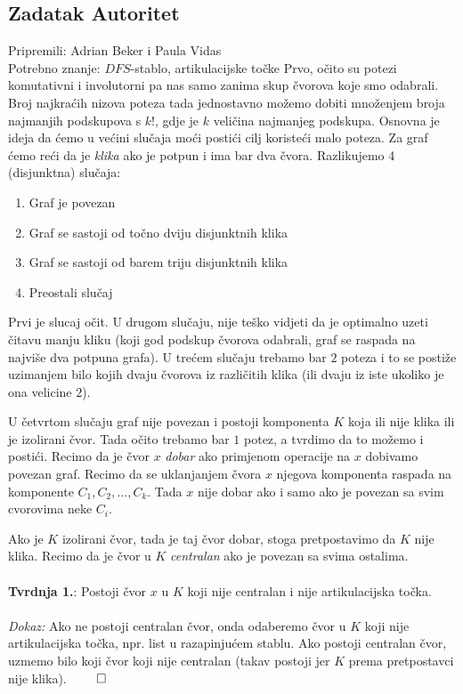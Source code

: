 \subsection*{Zadatak Autoritet}
\textsf{Pripremili: Adrian Beker i Paula Vidas}\\
\textsf{Potrebno znanje: $DFS$-stablo, artikulacijske točke}
Prvo, očito su potezi komutativni i involutorni pa nas samo zanima skup čvorova
koje smo odabrali. Broj najkraćih nizova poteza tada jednostavno možemo dobiti
množenjem broja najmanjih podskupova s $k!$, gdje je $k$ veličina najmanjeg
podskupa. Osnovna je ideja da ćemo u većini slučaja moći postići cilj koristeći
malo poteza. Za graf ćemo reći da je \textit{klika} ako je potpun i ima bar dva čvora. Razlikujemo 4 (disjunktna) slučaja:

\begin{enumerate}
    \item Graf je povezan
    \item Graf se sastoji od točno dviju disjunktnih klika
    \item Graf se sastoji od barem triju disjunktnih klika
    \item Preostali slučaj
\end{enumerate}
Prvi je slucaj očit. U drugom slučaju, nije teško vidjeti da je optimalno uzeti čitavu manju kliku (koji god podskup čvorova odabrali, graf se raspada na najviše dva potpuna grafa).
U trećem slučaju trebamo bar $2$ poteza i to se postiže uzimanjem bilo kojih dvaju čvorova iz različitih klika (ili dvaju iz iste ukoliko je ona velicine $2$).

U četvrtom slučaju graf nije povezan i postoji komponenta $K$ koja ili nije klika ili je izolirani čvor. Tada očito trebamo bar $1$ potez, a tvrdimo da to možemo i postići. Recimo da je čvor $x$ \textit{dobar} ako primjenom operacije na $x$ dobivamo povezan graf. Recimo da se uklanjanjem čvora $x$ njegova komponenta raspada na komponente $C_1, C_2, …, C_k$. Tada $x$ nije dobar ako i samo ako je povezan sa svim cvorovima neke $C_i$.

Ako je $K$ izolirani čvor, tada je taj čvor dobar, stoga pretpostavimo da $K$ nije klika. Recimo da je čvor u $K$ \textit{centralan} ako je povezan sa svima ostalima.
\\\\
\textbf{Tvrdnja 1.}: Postoji čvor $x$ u $K$ koji nije centralan i nije artikulacijska točka.
\\\\
\textit{Dokaz:} Ako ne postoji centralan čvor, onda odaberemo čvor u $K$ koji nije artikulacijska točka, npr. list u razapinjućem stablu. Ako postoji centralan čvor, uzmemo bilo koji čvor koji nije centralan (takav postoji jer $K$ prema pretpostavci nije klika). $\qed$

